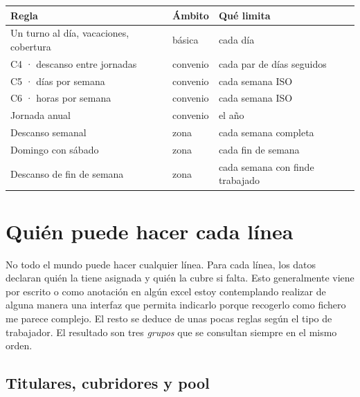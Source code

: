 \documentclass[11pt,a4paper]{article}
\begin{document}
\begin{center}
\begin{tabular}{@{}lll@{}}
  \toprule
  Regla & Ámbito & Qué limita \\
  \midrule
  Un turno al día, vacaciones, cobertura & básica & cada día \\
  C4 · descanso entre jornadas & convenio & cada par de días seguidos \\
  C5 · días por semana & convenio & cada semana ISO \\
  C6 · horas por semana & convenio & cada semana ISO \\
  Jornada anual & convenio & el año \\
  Descanso semanal & zona & cada semana completa \\
  Domingo con sábado & zona & cada fin de semana \\
  Descanso de fin de semana & zona & cada semana con finde trabajado \\
  \bottomrule
\end{tabular}
\end{center}

\section{Quién puede hacer cada línea}
\label{sec:quien}

No todo el mundo puede hacer cualquier línea. Para cada línea, los datos declaran quién la tiene
asignada y quién la cubre si falta. Esto generalmente viene por escrito o como anotación en algún excel
estoy contemplando realizar de alguna manera una interfaz que permita indicarlo porque recogerlo como fichero
me parece complejo. El resto se deduce de unas pocas reglas según el tipo de
trabajador. El resultado son tres \emph{grupos} que se consultan siempre en el mismo orden.

\subsection{Titulares, cubridores y pool}
\end{document}
